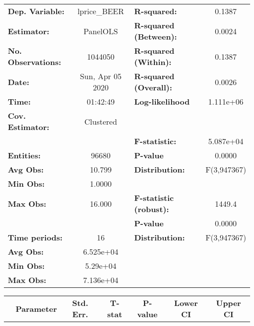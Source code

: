 \documentclass{report}
\begin{document}
\begin{center}
\begin{tabular}{lclc}
\toprule
\textbf{Dep. Variable:}    &    lprice\_BEER    & \textbf{  R-squared:         }   &      0.1387      \\
\textbf{Estimator:}        &      PanelOLS      & \textbf{  R-squared (Between):}  &      0.0024      \\
\textbf{No. Observations:} &      1044050       & \textbf{  R-squared (Within):}   &      0.1387      \\
\textbf{Date:}             &  Sun, Apr 05 2020  & \textbf{  R-squared (Overall):}  &      0.0026      \\
\textbf{Time:}             &      01:42:49      & \textbf{  Log-likelihood     }   &    1.111e+06     \\
\textbf{Cov. Estimator:}   &     Clustered      & \textbf{                     }   &                  \\
\textbf{}                  &                    & \textbf{  F-statistic:       }   &    5.087e+04     \\
\textbf{Entities:}         &       96680        & \textbf{  P-value            }   &      0.0000      \\
\textbf{Avg Obs:}          &       10.799       & \textbf{  Distribution:      }   &   F(3,947367)    \\
\textbf{Min Obs:}          &       1.0000       & \textbf{                     }   &                  \\
\textbf{Max Obs:}          &       16.000       & \textbf{  F-statistic (robust):} &      1449.4      \\
\textbf{}                  &                    & \textbf{  P-value            }   &      0.0000      \\
\textbf{Time periods:}     &         16         & \textbf{  Distribution:      }   &   F(3,947367)    \\
\textbf{Avg Obs:}          &     6.525e+04      & \textbf{                     }   &                  \\
\textbf{Min Obs:}          &      5.29e+04      & \textbf{                     }   &                  \\
\textbf{Max Obs:}          &     7.136e+04      & \textbf{                     }   &                  \\
\bottomrule
\end{tabular}
\begin{tabular}{lcccccc}
                           & \textbf{Parameter} & \textbf{Std. Err.} & \textbf{T-stat} & \textbf{P-value} & \textbf{Lower CI} & \textbf{Upper CI}  \\

\end{tabular}
\end{center}
\end{document}
